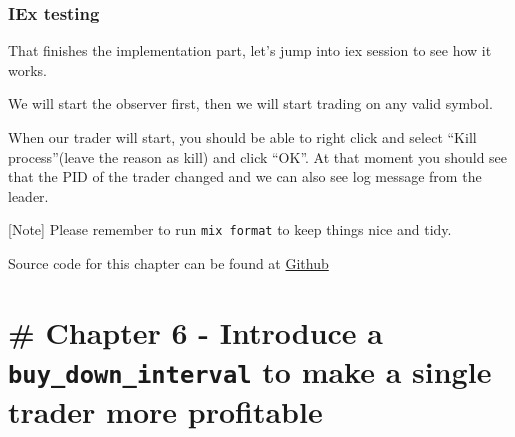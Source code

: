 \documentclass[
  oneside]{book}
\newenvironment{Shaded}{\begin{snugshade}}{\end{snugshade}}
\newcommand{\AttributeTok}[1]{\textcolor[rgb]{0.77,0.63,0.00}{#1}}
\newcommand{\CommentTok}[1]{\textcolor[rgb]{0.56,0.35,0.01}{\textit{#1}}}
\newcommand{\ErrorTok}[1]{\textcolor[rgb]{0.64,0.00,0.00}{\textbf{#1}}}
\newcommand{\ExtensionTok}[1]{#1}
\newcommand{\KeywordTok}[1]{\textcolor[rgb]{0.13,0.29,0.53}{\textbf{#1}}}
\newcommand{\NormalTok}[1]{#1}
\newcommand{\OperatorTok}[1]{\textcolor[rgb]{0.81,0.36,0.00}{\textbf{#1}}}
\newcommand{\StringTok}[1]{\textcolor[rgb]{0.31,0.60,0.02}{#1}}
\begin{document}
\hypertarget{iex-testing}{%
\subsection{IEx testing}\label{iex-testing}}

That finishes the implementation part, let's jump into iex session to see how it works.

We will start the observer first, then we will start trading on any valid symbol.

When our trader will start, you should be able to right click and select ``Kill process''(leave the reason as kill) and click ``OK''. At that moment you should see that the PID of the trader changed and we can also see log message from the leader.

\begin{Shaded}
\end{Shaded}

{[}Note{]} Please remember to run \texttt{mix\ format} to keep things nice and tidy.

Source code for this chapter can be found at \href{https://github.com/frathon/create-a-cryptocurrency-trading-bot-in-elixir-source-code/tree/chapter_05}{Github}

\hypertarget{chapter-6---introduce-a-buy_down_interval-to-make-a-single-trader-more-profitable}{%
\chapter{\texorpdfstring{\# Chapter 6 - Introduce a \texttt{buy\_down\_interval} to make a single trader more profitable}{\# Chapter 6 - Introduce a buy\_down\_interval to make a single trader more profitable}}\label{chapter-6---introduce-a-buy_down_interval-to-make-a-single-trader-more-profitable}}
\end{document}
